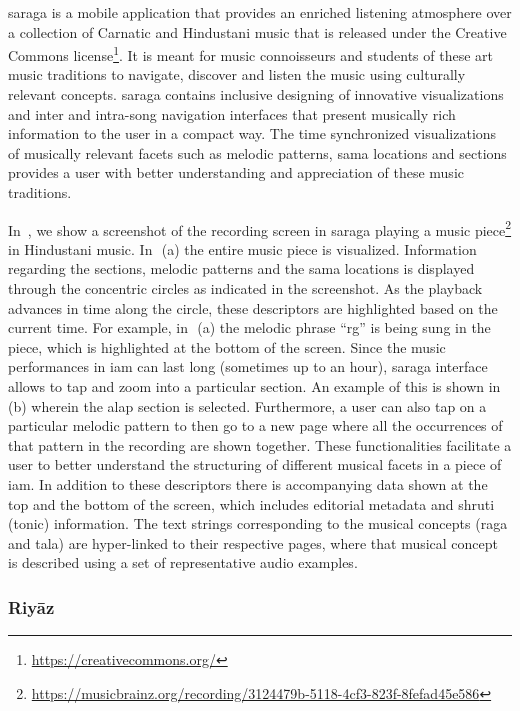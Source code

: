 \Gls{saraga} is a mobile application that provides an enriched listening atmosphere over a collection of Carnatic and Hindustani music that is released under the Creative Commons license\footnote{\url{https://creativecommons.org/}}. It is meant for music connoisseurs and students of these art music traditions to navigate, discover and listen the music using culturally relevant concepts. \gls{saraga} contains inclusive designing of innovative visualizations and inter and intra-song navigation interfaces that present musically rich information to the user in a compact way. The time synchronized visualizations of musically relevant facets such as melodic patterns, \gls{sama} locations and sections provides a user with better understanding and appreciation of these music traditions.

In~, we show a screenshot of the recording screen in \gls{saraga} playing a music piece\footnote{\url{https://musicbrainz.org/recording/3124479b-5118-4cf3-823f-8fefad45e586}} in Hindustani music. In~\,(a) the entire music piece is visualized. Information regarding the sections, melodic patterns and the \gls{sama} locations is displayed through the concentric circles as indicated in the screenshot. As the playback advances in time along the circle, these descriptors are highlighted based on the current time. For example, in~\,(a) the melodic phrase ``rg'' is being sung in the piece, which is highlighted at the bottom of the screen. Since the music performances in \gls{iam} can last long (sometimes up to an hour), \gls{saraga} interface allows to tap and zoom into a particular section. An example of this is shown in~\,(b) wherein the \gls{alap} section is selected. Furthermore, a user can also tap on a particular melodic pattern to then go to a new page where all the occurrences of that pattern in the recording are shown together. These functionalities facilitate a user to better understand the structuring of different musical facets in a piece of \gls{iam}. In addition to these descriptors there is accompanying data shown at the top and the bottom of the screen, which includes editorial metadata and \gls{shruti} (tonic) information. The text strings corresponding to the musical concepts (\gls{raga} and \gls{tala}) are hyper-linked to their respective pages, where that musical concept is described using a set of representative audio examples. 


\subsubsection{Riy\={a}z}
\label{sec:riyaz}

